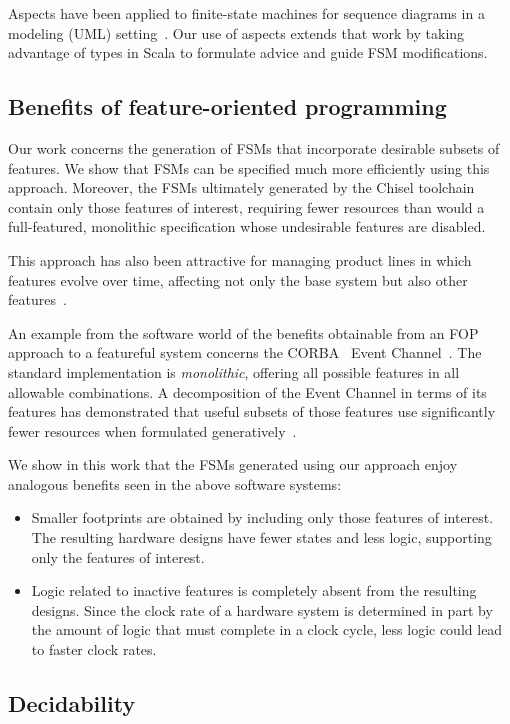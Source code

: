 \documentclass[conference]{IEEEtran}
\begin{document}
Aspects have been applied to finite-state machines for sequence diagrams in a modeling (UML) setting~\cite{aspectsUML}.  Our use of aspects extends that work by taking advantage of types in Scala to formulate advice and guide FSM modifications. 

\subsection{Benefits of feature-oriented programming}\label{sec:benefop}

Our work concerns the generation of FSMs that incorporate desirable subsets of features.  We show that FSMs can be specified much more efficiently using this approach.  Moreover, the FSMs ultimately generated by the Chisel toolchain contain only those features of interest, requiring fewer resources than would a full-featured, monolithic specification whose undesirable features are disabled.

This approach has also been attractive for managing product lines in which features evolve over time, affecting not only the base system but also other features~\cite{10.1145/2897695.2897701}. 

An example from the software world of the benefits obtainable from an FOP approach to a featureful system concerns the CORBA~\cite{CORBA:00} Event Channel~\cite{CORBAService:02a}. The standard implementation is \emph{monolithic}, offering all possible features in all allowable combinations.  A decomposition of the Event Channel in terms of its features has demonstrated that useful subsets of those features use significantly fewer resources when formulated generatively~\cite{Pratap:04}.   

We show in this work that the FSMs generated using our approach enjoy analogous benefits seen in the above software systems:
\begin{itemize}
    \item Smaller footprints are obtained by including only those features of interest.  The resulting hardware designs have fewer states and less logic, supporting only the features of interest.
    \item Logic related to inactive features is completely absent from the resulting designs. Since the clock rate of a hardware system is determined in part by the amount of logic that must complete in a clock cycle, less logic could lead to faster clock rates.
\end{itemize}

  
\subsection{Decidability}\label{sec:decide}
\end{document}
